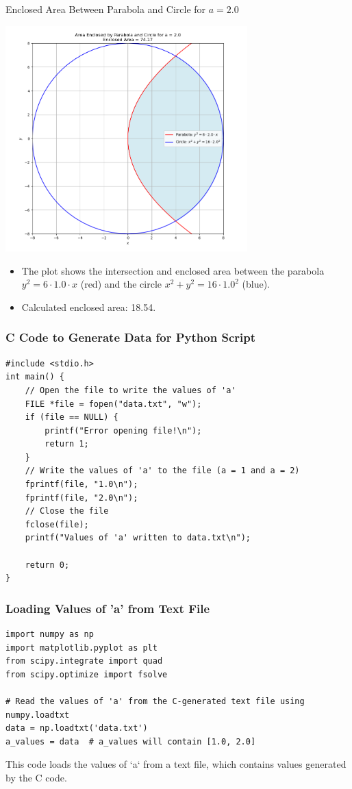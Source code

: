 \documentclass{beamer}
\begin{document}
\begin{frame}{Enclosed Area Between Parabola and Circle for \( a = 2.0 \)}
    \begin{center}
        \includegraphics[width=0.7\textwidth]{figs/fig_2.png}
    \end{center}
    \vspace{0.5cm}
    \begin{itemize}
        \item The plot shows the intersection and enclosed area between the parabola \( y^2 = 6 \cdot 1.0 \cdot x \) (red) and the circle \( x^2 + y^2 = 16 \cdot 1.0^2 \) (blue).
        \item Calculated enclosed area: 18.54.
    \end{itemize}
\end{frame}
\begin{frame}[fragile]
    \frametitle{C Code to Generate Data for Python Script}

    \begin{lstlisting}
#include <stdio.h>
int main() {
    // Open the file to write the values of 'a'
    FILE *file = fopen("data.txt", "w");
    if (file == NULL) {
        printf("Error opening file!\n");
        return 1;
    }
    // Write the values of 'a' to the file (a = 1 and a = 2)
    fprintf(file, "1.0\n");
    fprintf(file, "2.0\n");
    // Close the file
    fclose(file);
    printf("Values of 'a' written to data.txt\n");

    return 0;
}
    \end{lstlisting}
\end{frame}
\begin{frame}[fragile]
    \frametitle{Loading Values of 'a' from Text File}

    \begin{lstlisting}
import numpy as np
import matplotlib.pyplot as plt
from scipy.integrate import quad
from scipy.optimize import fsolve

# Read the values of 'a' from the C-generated text file using numpy.loadtxt
data = np.loadtxt('data.txt')
a_values = data  # a_values will contain [1.0, 2.0]
    \end{lstlisting}

    This code loads the values of `a` from a text file, which contains values generated by the C code.
\end{frame}
\end{document}
